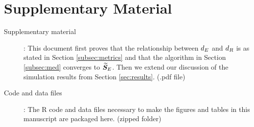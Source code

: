 \section*{Supplementary Material}

\begin{description}
\item[Supplementary material]:  This document first proves that the relationship between ${d_E}$ and ${d_R}$ is as stated in Section \ref{subsec:metrics} and that the algorithm in Section \ref{subsec:med} converges to ${\widetilde{\bm S}_E}$.  Then we extend our discussion of the simulation results from Section \ref{sec:results}. (.pdf file)


\item[Code and data files]: The R code and data files necessary to make the figures and tables in this manuscript are packaged here. (zipped folder)

\end{description}


